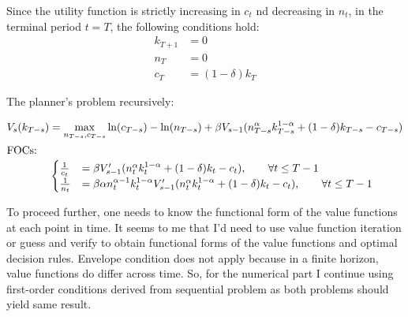 \documentclass[]{article}
\begin{document}
Since the utility function is strictly increasing in $c_t$ nd decreasing in $n_t$, in the terminal period $t = T$, the following conditions hold:
\begin{equation}
	\begin{split}
		k_{T + 1}& = 0 \\
		n_T& = 0 \\
		c_T& = (1 - \delta)k_T
	\end{split}\nonumber
\end{equation}


The planner's problem recursively:

\begin{equation}
	\begin{split}
		V_{s}(k_{T - s})& = \max\limits_{n_{T - s}, c_{T - s}}\ln(c_{T - s}) - \ln(n_{T - s}) + \beta V_{s-1}(n_{T - s}^\alpha k_{T - s}^{1 - \alpha} + (1 - \delta)k_{T - s} - c_{T - s}) \nonumber \\
		\intertext{FOCs:}
		&\begin{cases}
			\frac{1}{c_t}& = \beta V_{s - 1}'(n_t^\alpha k_t^{1 - \alpha} + (1 - \delta)k_t - c_t), \qquad\forall t\leq T - 1 \\
			\frac{1}{n_t}& = \beta\alpha n_t^{\alpha - 1}k_t^{1 - \alpha}V_{s - 1}'(n_t^\alpha k_t^{1 - \alpha} + (1 - \delta)k_t - c_t), \qquad\forall t\leq T - 1 \\
		\end{cases}	
	\end{split}
\end{equation}

To proceed further, one needs to know the functional form of the value functions at each point in time. It seems to me that I'd need to use value function iteration or guess and verify to obtain functional forms of the value functions and optimal decision rules. Envelope condition does not apply because in a finite horizon, value functions do differ across time. So, for the numerical part I continue using first-order conditions derived from sequential problem as both problems should yield same result.

\subsubsection{}
\end{document}

